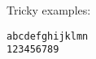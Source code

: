 \documentclass{article}
\begin{document}
Tricky examples:

\begin{verbatim}
abcdefghijklmn
123456789
\end{verbatim}
\end{document}
